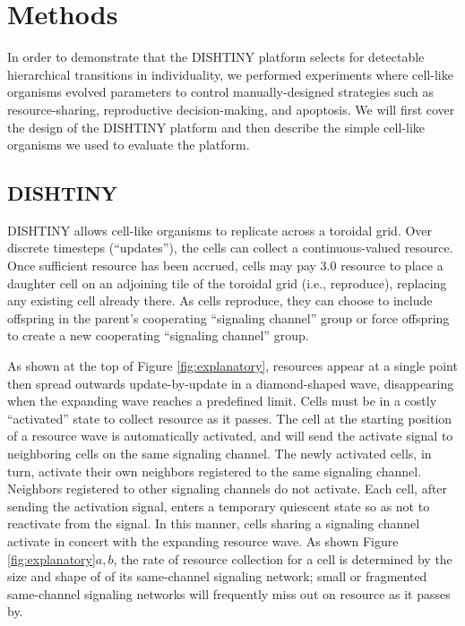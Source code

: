 \section{Methods}

In order to demonstrate that the DISHTINY platform selects for detectable hierarchical transitions in individuality, we performed experiments where cell-like organisms evolved parameters to control manually-designed strategies such as resource-sharing, reproductive decision-making, and apoptosis.
We will first cover the design of the DISHTINY platform and then describe the simple cell-like organisms we used to evaluate the platform.

\subsection{DISHTINY}



DISHTINY allows cell-like organisms to replicate across a toroidal grid.
Over discrete timesteps (``updates''), the cells can collect a continuous-valued resource.
Once sufficient resource has been accrued, cells may pay $3.0$ resource to place a daughter cell on an adjoining tile of the toroidal grid (i.e., reproduce), replacing any existing cell already there.
As cells reproduce, they can choose to include offspring in the parent's cooperating ``signaling channel'' group or force offspring to create a new cooperating ``signaling channel'' group.

As shown at the top of Figure \ref{fig:explanatory}, resources appear at a single point then spread outwards update-by-update in a diamond-shaped wave, disappearing when the expanding wave reaches a predefined limit.
Cells must be in a costly ``activated'' state to collect resource as it passes.
The cell at the starting position of a resource wave is automatically activated, and will send the activate signal to neighboring cells on the same signaling channel.
The newly activated cells, in turn, activate their own neighbors registered to the same signaling channel.
Neighbors registered to other signaling channels do not activate.
Each cell, after sending the activation signal, enters a temporary quiescent state so as not to reactivate from the signal.
In this manner, cells sharing a signaling channel activate in concert with the expanding resource wave.
As shown Figure \ref{fig:explanatory}$a,b$, the rate of resource collection for a cell is determined by the size and shape of of its same-channel signaling network;
small or fragmented same-channel signaling networks will frequently miss out on resource as it passes by.

